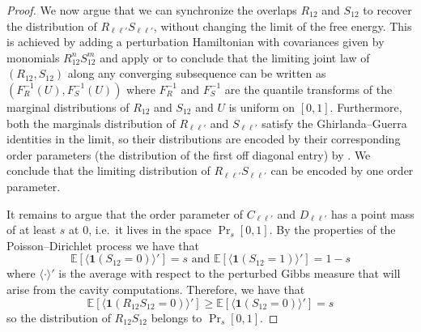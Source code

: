 \documentclass[11pt]{amsart}
\theoremstyle{remark}
\theoremstyle{definition}
\numberwithin{equation}{section}
\numberwithin{proposition}{section}
\numberwithin{figure}{section}
\numberwithin{table}{section}
\newcommand{\E}{\mathbb{E}}
\renewcommand{\geq}{\geqslant}
\newcommand{\Ll}{\left}
\newcommand{\Rr}{\right}
\newcommand{\1}{\mathbf{1}}
\begin{document}
\begin{proof}
We now argue that we can synchronize the overlaps $R_{12}$ and $S_{12}$ to recover the distribution of $R_{\ell \ell'} S_{\ell\ell'}$, without changing the limit of the free energy. This is achieved by adding a perturbation Hamiltonian with covariances given by monomials $R_{12}^n S_{12}^m$ and apply \cite[Theorem~4]{pan} or \cite[Section~5]{mourrat2020nonconvex} to conclude that the limiting joint law of $(R_{12},S_{12})$ along any converging subsequence can be written as $(F^{-1}_R(U), F^{-1}_S(U))$ where $F^{-1}_R$ and $F^{-1}_S$ are the quantile transforms of the marginal distributions of $R_{12}$ and $S_{12}$ and $U$ is uniform on $[0,1]$. Furthermore, both the marginals distribution of $R_{\ell\ell'}$ and $S_{\ell\ell'}$ satisfy the Ghirlanda--Guerra identities in the limit, so their distributions are encoded by their corresponding  order parameters (the distribution of the first off diagonal entry) by \cite[Theorem~2.14 and Theorem~2.15]{pan}. We conclude that the limiting distribution of $R_{\ell\ell'}S_{\ell\ell'}$ can be encoded by one order parameter. 

It remains to argue that the order parameter  of $C_{\ell\ell'}$ and $D_{\ell\ell'}$ has a point mass of at least $s$ at $0$, i.e.\ it lives in the space $\Pr_s[0,1]$. By the properties of the Poisson--Dirichlet process \cite[Equation~2.34]{pan} we have that
\[
\E\Ll[ \langle \1(S_{12} = 0) \rangle' \Rr] = s \text{ and } \E\Ll[ \langle \1(S_{12} = 1) \rangle' \Rr] = 1-s
\]
where $\langle \cdot \rangle'$ is the average with respect to the perturbed Gibbs measure that will arise from the cavity computations. Therefore, we have that
\[
\E\Ll[ \langle  \1(R_{12}S_{12} = 0) \rangle' \Rr] \geq \E\Ll[ \langle \1(S_{12} = 0) \rangle' \Rr] = s 
\]
so the distribution of $R_{12}S_{12}$ belongs to $\Pr_s[0,1]$. 


\end{proof}
\end{document}
